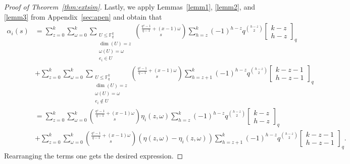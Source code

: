 \documentclass[11pt,a4paper,reqno,twoside]{amsart}
\theoremstyle{definition}
\newcommand{\F}{\mathbb{F}}
\newcommand\qbin[3]{\left[\begin{matrix} #1 \\ #2 \end{matrix}\right]_{#3}}
\begin{document}
\begin{proof}[Proof of Theorem~\ref{thm:extsim}]
 Lastly, we apply Lemmas~\ref{lemm1}, \ref{lemm2}, and \ref{lemm3} from Appendix~\ref{sec:apen} and obtain that
  \begin{align*}
     \alpha_i(s) &= \sum_{z=0}^k \sum_{\omega=0}^k \sum_{\substack{U \le \F_q^k \\ \dim(U)=z\\ \omega(U)=\omega \\ e_i \in U}} \binom{\frac{q^z-1}{q-1}+(x-1)\omega}{s} \sum_{h=z}^k (-1)^{h-z} q^{\binom{h-z}{2}}\qbin{k-z}{h-z}{q} \\
     &+ \sum_{z=0}^k \sum_{\omega=0}^k \sum_{\substack{U \le \F_q^k \\ \dim(U)=z\\ \omega(U)=\omega \\ e_i \notin U}} \binom{\frac{q^z-1}{q-1}+(x-1)\omega}{s} \sum_{h=z+1}^k (-1)^{h-z} q^{\binom{h-z}{2}} \qbin{k-z-1}{h-z-1}{q} \\
     &= \sum_{z=0}^k \sum_{\omega=0}^k \binom{\frac{q^z-1}{q-1}+(x-1)\omega}{s} \eta_i(z,\omega)\sum_{h=z}^k (-1)^{h-z} q^{\binom{h-z}{2}} \qbin{k-z}{h-z}{q} \\
     &+
     \sum_{z=0}^k \sum_{\omega=0}^k \binom{\frac{q^z-1}{q-1}+(x-1)\omega}{s} (\eta(z,\omega) - \eta_i(z,\omega))\sum_{h=z+1}^k (-1)^{h-z} q^{\binom{h-z}{2}}  \qbin{k-z-1}{h-z-1}{q}. 
 \end{align*}
Rearranging the terms one gets the desired expression. 
\end{proof}
\end{document}
